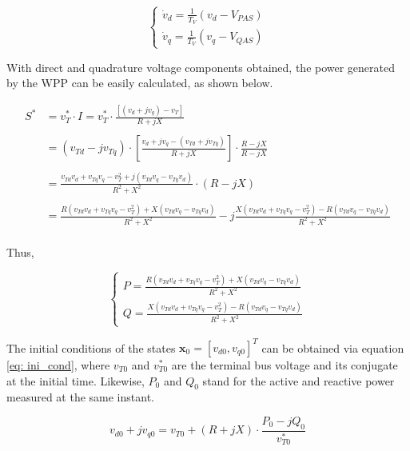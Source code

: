 \begin{equation}
	\begin{cases}
		\dot{v}_{d} = \frac{1}{T_{V}}(v_{d} - V_{PAS}) \\
		\dot{v}_{q} = \frac{1}{T_{V}}(v_{q} - V_{QAS})
	\end{cases}
	\label{eq: DelayBlocks}
\end{equation}

With direct and quadrature voltage components obtained, the power generated by the WPP can be easily calculated, as shown below.

\begin{align*}
		S^{*} &= v_{T}^{*} \cdot I = v_{T}^{*} \cdot \frac{[(v_{d} + jv_{q}) - v_{T}]}{R + jX} \\
		\\
		&= (v_{Td} - jv_{Tq})\cdot\left[\frac{v_{d} + jv_{q} - (v_{Td} + jv_{Tq})}{R + jX}\right]\cdot \frac{R - jX}{R - jX} \\
		\\
		&= \frac{v_{Td}v_{d} + v_{Tq}v_{q} - v_{T}^{2} + j(v_{Td}v_{q} - v_{Tq}v_{d})}{R^{2} + X^{2}}\cdot (R - jX) \\
		\\
		&= \frac{R(v_{Td}v_{d} + v_{Tq}v_{q} - v_{T}^{2}) + X(v_{Td}v_{q} - v_{Tq}v_{d})}{R^{2} + X^{2}} - j\frac{X(v_{Td}v_{d} + v_{Tq}v_{q} - v_{T}^{2}) - R(v_{Td}v_{q} - v_{Tq}v_{d})}{R^{2} + X^{2}} \\
\end{align*}

Thus,

\begin{equation}
	\begin{cases}
		P = \frac{R(v_{Td}v_{d} + v_{Tq}v_{q} - v_{T}^{2}) + X(v_{Td}v_{q} - v_{Tq}v_{d})}{R^{2} + X^{2}} \\
		Q = \frac{X(v_{Td}v_{d} + v_{Tq}v_{q} - v_{T}^{2}) - R(v_{Td}v_{q} - v_{Tq}v_{d})}{R^{2} + X^{2}}
	\end{cases}
	\label{eq: Outputs}
\end{equation}

The initial conditions of the states $\mathbf{x}_{0} = [v_{d0}, v_{q0}]^T$ can be obtained via equation \eqref{eq: ini_cond}, where $v_{T0}$ and $v_{T0}^{*}$ are the terminal bus voltage and its conjugate at the initial time. Likewise, $P_{0}$ and $Q_{0}$ stand for the active and reactive power measured at the same instant.

\begin{equation}
		v_{d0} + jv_{q0} = v_{T0} + (R + jX) \cdot \frac{P_{0} - jQ_{0}}{v_{T0}^{*}}
		\label{eq: ini_cond}
\end{equation}

